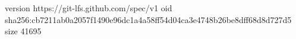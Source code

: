 version https://git-lfs.github.com/spec/v1
oid sha256:cb7211ab0a2057f1490e96dc1a4a58ff54d04ca3e4748b26be8dff68d8d727d5
size 41695
